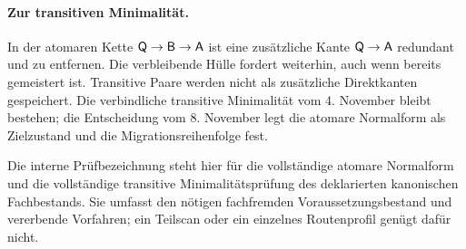 \paragraph{Zur transitiven Minimalität.}
In der atomaren Kette $\mathsf{Q}\to\mathsf{B}\to\mathsf{A}$ ist eine zusätzliche Kante
$\mathsf{Q}\to\mathsf{A}$ redundant und zu entfernen. Die verbleibende Hülle fordert
 weiterhin, auch wenn  bereits gemeistert ist.
Transitive Paare werden nicht als zusätzliche Direktkanten gespeichert.
Die verbindliche transitive Minimalität vom 4. November
bleibt bestehen; die Entscheidung vom 8. November legt die atomare
Normalform als Zielzustand und die Migrationsreihenfolge fest.

Die interne Prüfbezeichnung  steht hier für die vollständige
atomare Normalform und die vollständige transitive Minimalitätsprüfung
des deklarierten kanonischen Fachbestands. Sie umfasst den nötigen
fachfremden Voraussetzungsbestand und vererbende Vorfahren; ein Teilscan
oder ein einzelnes Routenprofil genügt dafür nicht.

